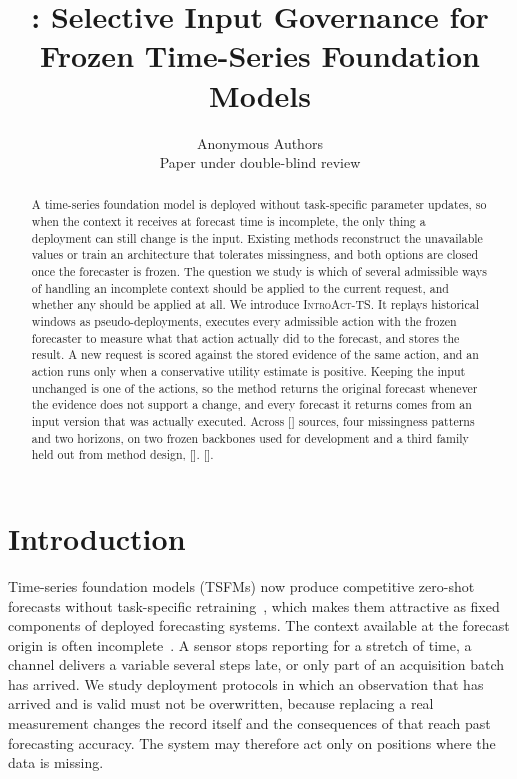 \documentclass{article}
\title{\introact{}: Selective Input Governance for \\
Frozen Time-Series Foundation Models}
\author{Anonymous Authors\\Paper under double-blind review}
\newcommand{\ph}[1]{\textcolor{phgray}{\textsf{[\detokenize{#1}]}}}
\newcommand{\introact}{\textsc{IntroAct-TS}}
\newcommand{\tsfm}{TSFM}
\begin{document}
\maketitle

\begin{abstract}
A time-series foundation model is deployed without task-specific parameter updates, so when the
context it receives at forecast time is incomplete, the only thing a deployment can still
change is the input. Existing methods reconstruct the unavailable values or train an
architecture that tolerates missingness, and both options are closed once the forecaster is
frozen. The question we study is which of several admissible ways of handling an incomplete
context should be applied to the current request, and whether any should be applied at all. We
introduce \introact{}. It replays historical windows as pseudo-deployments, executes every
admissible action with the frozen forecaster to measure what that action actually did to the
forecast, and stores the result. A new request is scored against the stored evidence of the
same action, and an action runs only when a conservative utility estimate is positive.
Keeping the input unchanged is one of the actions, so the method returns the original forecast
whenever the evidence does not support a change, and every forecast it returns comes from an
input version that was actually executed. Across \ph{N_DATASETS} sources, four missingness
patterns and two horizons, on two frozen backbones used for development and a third family
held out from method design, \ph{ABSTRACT_RESULT}. \ph{ABSTRACT_CLOSING}.
\end{abstract}

\section{Introduction}
\label{sec:intro}

Time-series foundation models (\tsfm{}s) now produce competitive zero-shot forecasts without
task-specific retraining~\citep{ansari2024chronos,chronosbolt2025,das2024timesfm,woo2024moirai,
chronos2_2025}, which makes them attractive as fixed components of deployed forecasting
systems. The context available at the forecast origin is often
incomplete~\citep{chen2024bitgraph,peng2025s4m}. A sensor stops reporting for a stretch of
time, a channel delivers a variable several steps late, or only part of an acquisition batch
has arrived. We study deployment protocols in which an observation that has arrived and is
valid must not be overwritten, because replacing a real measurement changes the record itself
and the consequences of that reach past forecasting accuracy. The system may therefore act
only on positions where the data is missing.
\end{document}

